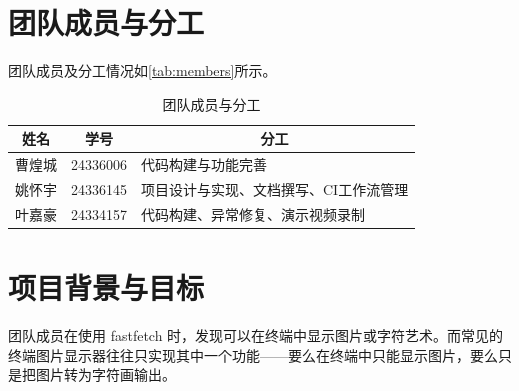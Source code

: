 \documentclass{SYSUReport}
\date{\today}
\begin{document}
\cover
\thispagestyle{empty} %
\clearpage

%
%


\setcounter{page}{1}
\tableofcontents
\clearpage

\setcounter{page}{1}

\section{团队成员与分工}

团队成员及分工情况如\autoref{tab:members}所示。

\begin{table}[!htbp]
    \centering
    \caption{团队成员与分工}
    \label{tab:members}
    \begin{tabular}{ccl}
        \toprule
        姓名 & 学号 & \multicolumn{1}{c}{分工} \\
        \midrule
        曹煌城 & 24336006      & 代码构建与功能完善 \\
        姚怀宇 & 24336145      & 项目设计与实现、文档撰写、CI工作流管理 \\
        叶嘉豪 & 24334157      & 代码构建、异常修复、演示视频录制 \\
        \bottomrule
    \end{tabular}
\end{table}

\section{项目背景与目标}
团队成员在使用 fastfetch 时，发现可以在终端中显示图片或字符艺术。而常见的终端图片显示器往往只实现其中一个功能——要么在终端中只能显示图片，要么只是把图片转为字符画输出。
\end{document}
